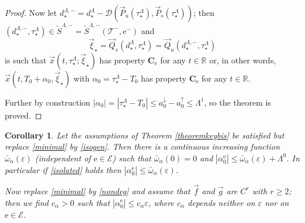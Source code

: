 \documentclass[10pt]{article}
\numberwithin{equation}{section}
\def\al{\alpha}
\def\ep{\varepsilon}
\def\R{{\mathbb R}}
\def\ee{{\mathrm e}}
\def\EE{{\mathcal E}}
\def\TT{{\mathcal T}}
\def\DDD{\mathscr{D}}
\def\aup{a^{\uparrow}}
\def\adown{a^{\downarrow}}
\def\lzero{\Lambda^0}
\def\l1{\Lambda^{1}}
\def\Q{\vec{Q}}
\def\P{\vec{P}}
\def\xxi{\vec{\xi}}
\def\x{\vec{x}}
\def\f{\vec{f}}
\def\g{\vec{g}}
\newcommand\bs[1]{{\boldsymbol{#1}}}
\newtheorem{cor}[theorem]{Corollary}
\theoremstyle{definition}
\theoremstyle{remark}
\begin{document}
\begin{proof}
Now let $d^{\Lambda,-}_\star=d_\star^{\Lambda}- \DDD(\P_u(\tau_\star^{\Lambda}), \P_s(\tau_\star^{\Lambda}))$; then
$(d^{\Lambda,-}_\star,\tau_\star^{\Lambda}) \in
\tilde{S}^{\Lambda,-}=\tilde{S}^{\Lambda,-}(\TT^-, \ee^-)$ and
$$\xxi_\star = \Q_s(d_\star^{\Lambda},\tau_\star^{\Lambda})= \Q_u(d^{\Lambda,-}_\star,\tau_\star^{\Lambda})$$
is such that $\x(t,\tau_\star^{\Lambda}; \xxi_\star)$ has property $\bs{C_{\ee}}$ for any $t \in \R$ or, in other words,
$\x(t,T_0+\alpha_0,\xxi_\star)$ with $\alpha_0=\tau_\star^{\Lambda}-T_0$ has property $\bs{C_{\ee}}$ for any $t \in \R$.

Further by construction   $ |\alpha_0| = |\tau_\star^{\Lambda}-T_0| \le \adown_0-\aup_0 \leq \l1$, so the theorem is proved.
\end{proof}



\begin{cor}\label{c.alpha0}
  Let the assumptions of Theorem \ref{theoremkeybis} be satisfied but replace \eqref{minimal} by \eqref{isogen}.%
 Then there is a continuous increasing function $\bar{\omega}_{\al}(\ep)$
 (independent of $\ee \in \EE$) such that $\bar{\omega}_{\al}(0)=0$
  and $|\al_0^{\ee}|\le \bar{\omega}_{\al}(\ep)+  \lzero$. In particular if  \eqref{isolated}  holds then
  $|\al_0^{\ee}|\le \bar{\omega}_{\al}(\ep)$.

  Now replace \eqref{minimal} by \eqref{nondeg} and assume that $\f$ and $\g$ are $C^r$ with $r \ge 2$; then we find $c_{\al}>0$ such that $|\al_0^{\ee}|\le c_{\al} \ep$,
  where $c_{\al}$ depends neither on $\ep$ nor on $\ee \in \EE$.
\end{cor}
\end{document}
